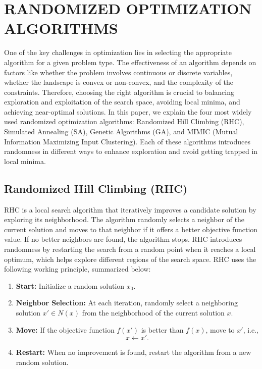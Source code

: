 \section{RANDOMIZED OPTIMIZATION ALGORITHMS}
One of the key challenges in optimization lies in selecting the appropriate algorithm for a given problem type. The effectiveness of an algorithm depends on factors like whether the problem involves continuous or discrete variables, whether the landscape is convex or non-convex, and the complexity of the constraints. Therefore, choosing the right algorithm is crucial to balancing exploration and exploitation of the search space, avoiding local minima, and achieving near-optimal solutions. In this paper, we explain the four most widely used randomized optimization algorithms: Randomized Hill Climbing (RHC), Simulated Annealing (SA), Genetic Algorithms (GA), and MIMIC (Mutual Information Maximizing Input Clustering). Each of these algorithms introduces randomness in different ways to enhance exploration and avoid getting trapped in local minima.
\subsection{Randomized Hill Climbing (RHC)}
RHC \cite{liu2016banditbasedrandommutationhillclimbing} is a local search algorithm that iteratively improves a candidate solution by exploring its neighborhood. The algorithm randomly selects a neighbor of the current solution and moves to that neighbor if it offers a better objective function value. If no better neighbors are found, the algorithm stops. RHC introduces randomness by restarting the search from a random point when it reaches a local optimum, which helps explore different regions of the search space. RHC uses the following working principle, summarized below:

\begin{enumerate}
    \item \textbf{Start:} Initialize a random solution $x_0$.
    \item \textbf{Neighbor Selection:} At each iteration, randomly select a neighboring solution $x' \in N(x)$ from the neighborhood of the current solution $x$.
    \item \textbf{Move:} If the objective function $f(x')$ is better than $f(x)$, move to $x'$, i.e., 
    \[
    x \leftarrow x'.
    \]
    \item \textbf{Restart:} When no improvement is found, restart the algorithm from a new random solution.
\end{enumerate}

